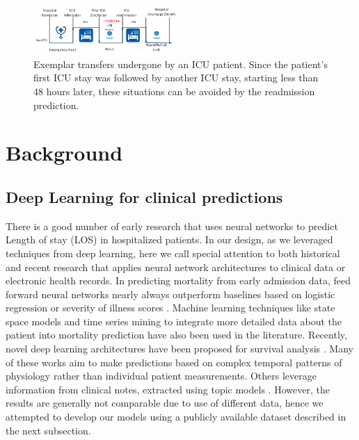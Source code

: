 \documentclass[letterpaper, 10pt, conference]{ieeeconf} %
\begin{document}
\begin{figure}
 \centering
 \includegraphics[width=0.49\textwidth]{Figures/mimic3.png}
 \caption{ Exemplar transfers undergone by an ICU patient. Since the patient’s first ICU stay was followed by another ICU stay, starting less than 48 hours later, these situations can be avoided by the readmission prediction.}
 \label{fig:readmission}
\end{figure}

\section{Background} \label{sec:background}

\subsection{Deep Learning for clinical predictions}
 
There is a good number of early research \cite{mobley2000predictions} that uses neural networks to predict  Length of stay (LOS) in hospitalized patients.  In our design, as we leveraged techniques from deep learning, here we call special attention to both historical and recent research that applies neural network architectures to clinical data or electronic health records. In predicting mortality from early admission data, feed forward neural networks nearly always outperform baselines based on logistic regression or severity of illness scores \cite{clermont2001predicting}. Machine learning techniques like state space models and time series mining to integrate more detailed data about the patient into mortality prediction have also been used in the literature. Recently, novel deep learning architectures have been proposed for survival analysis \cite{ranganath2016deep}. Many of these works aim to make predictions based on complex temporal patterns of physiology rather than individual patient measurements. Others leverage information from clinical notes, extracted using topic models \cite{lipton2015learning}. However, the results are generally not comparable due to use of different data, hence we attempted to develop our models using a publicly available dataset described in the next subsection.
\end{document}
